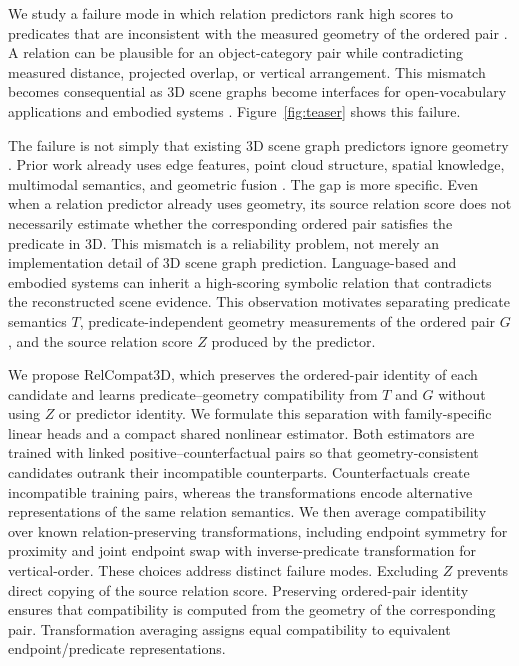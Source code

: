 We study a failure mode in which relation predictors rank high scores to predicates that are inconsistent with the measured geometry of the ordered pair \cite{nguyen2026relwitness,neau2026visual}. A relation can be plausible for an object-category pair while contradicting measured distance, projected overlap, or vertical arrangement. This mismatch becomes consequential as 3D scene graphs become interfaces for open-vocabulary applications and embodied systems \cite{koch2024open3dsg,hou2025fross,zhang2025open,wang2025open,saxena2025zing,fei2026open,madhavaram2026vizor}. Figure~\ref{fig:teaser} shows this failure.

The failure is not simply that existing 3D scene graph predictors ignore geometry \cite{wald2020learning}. Prior work already uses edge features, point cloud structure, spatial knowledge, multimodal semantics, and geometric fusion \cite{zhang2021exploiting,feng20233d,wang2023vl,koch2024sgrec3d,chen2024clip}. The gap is more specific. Even when a relation predictor already uses geometry, its source relation score does not necessarily estimate whether the corresponding ordered pair satisfies the predicate in 3D. This mismatch is a reliability problem, not merely an implementation detail of 3D scene graph prediction. Language-based and embodied systems can inherit a high-scoring symbolic relation that contradicts the reconstructed scene evidence. This observation motivates separating predicate semantics $T$, predicate-independent geometry measurements of the ordered pair $G$, and the source relation score $Z$ produced by the
predictor.

We propose RelCompat3D, which preserves the ordered-pair identity of each candidate and learns predicate--geometry compatibility from $T$ and $G$ without using $Z$ or predictor identity. We formulate this separation with family-specific linear heads and a compact shared nonlinear estimator. Both estimators are trained with linked positive--counterfactual pairs so that geometry-consistent candidates outrank their incompatible counterparts. Counterfactuals create incompatible training pairs, whereas the transformations encode alternative representations of the same relation semantics. We then average compatibility over known relation-preserving transformations, including endpoint symmetry for proximity and joint endpoint swap with inverse-predicate transformation for vertical-order. These choices address distinct failure modes. Excluding $Z$ prevents direct copying of the source relation score. Preserving ordered-pair identity ensures that compatibility is computed from the geometry of the corresponding pair. Transformation averaging assigns equal compatibility to equivalent endpoint/predicate representations. 

